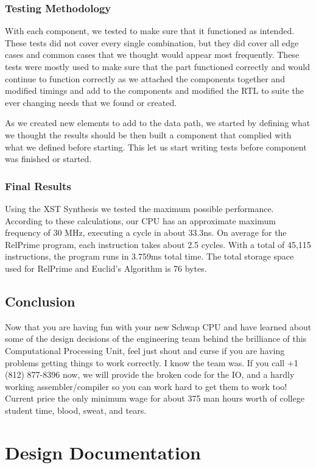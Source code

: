 \documentclass{report}
\begin{document}
		\subsection{Testing Methodology}
			With each component, we tested to make sure that it functioned as intended. These tests did not cover every single combination, but they did cover all edge cases and common cases that we thought would appear most frequently. These tests were mostly used to make sure that the part functioned correctly and would continue to function correctly as we attached the components together and modified timings and add to the components and modified the RTL to suite the ever changing needs that we found or created.\par
			As we created new elements to add to the data path, we started by defining what we thought the results should be then built a component that complied with what we defined before starting. This let us start writing tests before component was finished or started.
		\subsection{Final Results}
			Using the XST Synthesis we tested the maximum possible performance. According to these calculations, our CPU has an approximate maximum frequency of 30 MHz, executing a cycle in about 33.3ns. On average for the RelPrime program, each instruction takes about 2.5 cycles. With a total of 45,115 instructions, the program runs in 3.759ms total time. The total storage space used for RelPrime and Euclid's Algorithm is 76 bytes.
	\section{Conclusion}
		Now that you are having fun with your new Schwap CPU and have learned about some of the design decisions of the engineering team behind the brilliance of this Computational Processing Unit, feel just shout and curse if you are having problems getting things to work correctly. I know the team was. If you call +1 (812) 877-8396 now, we will provide the broken code for the IO, and a hardly working assembler/compiler so you can work hard to get them to work too! Current price the only minimum wage for about 375 man hours worth of college student time, blood, sweat, and tears.
\chapter{Design Documentation}
	
\end{document}
